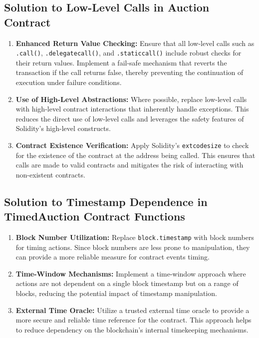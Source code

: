 \documentclass[conference]{IEEEtran}
\begin{document}
\subsection{Solution to Low-Level Calls in Auction Contract}
\begin{enumerate}
    \item \textbf{Enhanced Return Value Checking:} Ensure that all low-level calls such as \texttt{.call()}, \texttt{.delegatecall()}, and \texttt{.staticcall()} include robust checks for their return values. Implement a fail-safe mechanism that reverts the transaction if the call returns false, thereby preventing the continuation of execution under failure conditions.
    \item \textbf{Use of High-Level Abstractions:} Where possible, replace low-level calls with high-level contract interactions that inherently handle exceptions. This reduces the direct use of low-level calls and leverages the safety features of Solidity's high-level constructs.
    \item \textbf{Contract Existence Verification:} Apply Solidity's \texttt{extcodesize} to check for the existence of the contract at the address being called. This ensures that calls are made to valid contracts and mitigates the risk of interacting with non-existent contracts.
\end{enumerate}

\subsection{Solution to Timestamp Dependence in TimedAuction Contract Functions}
\begin{enumerate}
    \item \textbf{Block Number Utilization:} Replace \texttt{block.timestamp} with block numbers for timing actions. Since block numbers are less prone to manipulation, they can provide a more reliable measure for contract events timing.
    \item \textbf{Time-Window Mechanisms:} Implement a time-window approach where actions are not dependent on a single block timestamp but on a range of blocks, reducing the potential impact of timestamp manipulation.
    \item \textbf{External Time Oracle:} Utilize a trusted external time oracle to provide a more secure and reliable time reference for the contract. This approach helps to reduce dependency on the blockchain's internal timekeeping mechanisms.
\end{enumerate}
\end{document}

